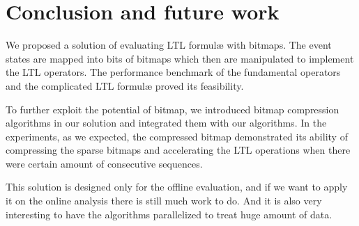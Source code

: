 \section{Conclusion and future work}\label{sec:bm:conclusion} %

We proposed a solution of evaluating LTL formul\ae{} with bitmaps. The event states are mapped into bits of bitmaps which then are manipulated to implement the LTL operators. The performance benchmark of the fundamental operators and the complicated LTL formul\ae{} proved its feasibility.

To further exploit the potential of bitmap, we introduced bitmap compression algorithms in our solution and integrated them with our algorithms. In the experiments, as we expected, the compressed bitmap demonstrated its ability of compressing the sparse bitmaps and accelerating the LTL operations when there were certain amount of consecutive sequences.

This solution is designed only for the offline evaluation, and if we want to apply it on the online analysis there is still much work to do. And it is also very interesting to have the algorithms parallelized to treat huge amount of data.


